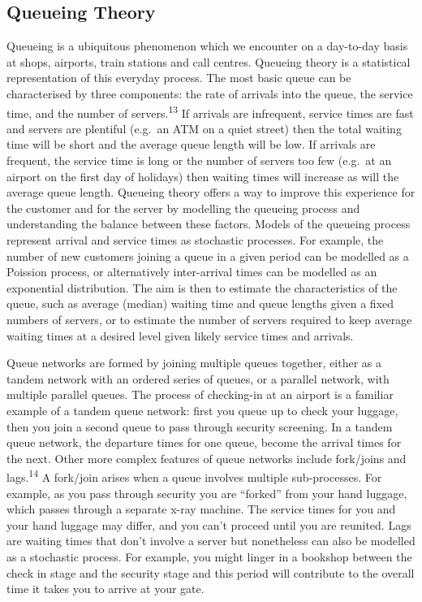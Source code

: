 \documentclass{article}
\begin{document}
\hypertarget{queueing-theory}{%
\subsection{Queueing Theory}\label{queueing-theory}}

Queueing is a ubiquitous phenomenon which we encounter on a day-to-day
basis at shops, airports, train stations and call centres. Queueing
theory is a statistical representation of this everyday process. The
most basic queue can be characterised by three components: the rate of
arrivals into the queue, the service time, and the number of
servers.\textsuperscript{13} If arrivals are infrequent, service times
are fast and servers are plentiful (e.g.~an ATM on a quiet street) then
the total waiting time will be short and the average queue length will
be low. If arrivals are frequent, the service time is long or the number
of servers too few (e.g.~at an airport on the first day of holidays)
then waiting times will increase as will the average queue length.
Queueing theory offers a way to improve this experience for the customer
and for the server by modelling the queueing process and understanding
the balance between these factors. Models of the queueing process
represent arrival and service times as stochastic processes. For
example, the number of new customers joining a queue in a given period
can be modelled as a Poission process, or alternatively inter-arrival
times can be modelled as an exponential distribution. The aim is then to
estimate the characteristics of the queue, such as average (median)
waiting time and queue lengths given a fixed numbers of servers, or to
estimate the number of servers required to keep average waiting times at
a desired level given likely service times and arrivals.

Queue networks are formed by joining multiple queues together, either as
a tandem network with an ordered series of queues, or a parallel
network, with multiple parallel queues. The process of checking-in at an
airport is a familiar example of a tandem queue network: first you queue
up to check your luggage, then you join a second queue to pass through
security screening. In a tandem queue network, the departure times for
one queue, become the arrival times for the next. Other more complex
features of queue networks include fork/joins and
lags.\textsuperscript{14} A fork/join arises when a queue involves
multiple sub-processes. For example, as you pass through security you
are ``forked'' from your hand luggage, which passes through a separate
x-ray machine. The service times for you and your hand luggage may
differ, and you can't proceed until you are reunited. Lags are waiting
times that don't involve a server but nonetheless can also be modelled
as a stochastic process. For example, you might linger in a bookshop
between the check in stage and the security stage and this period will
contribute to the overall time it takes you to arrive at your gate.
\end{document}
